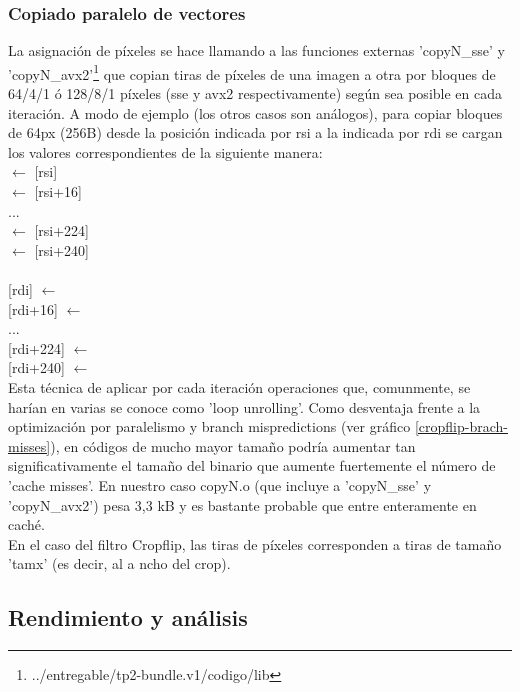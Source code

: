 \subsubsection{Copiado paralelo de vectores}
\label{explicacionCopyN}

La asignación de píxeles se hace llamando a las funciones externas 'copyN_sse' y 'copyN_avx2'\footnote{../entregable/tp2-bundle.v1/codigo/lib} que copian tiras de píxeles de una imagen a otra por bloques de 64/4/1 ó 128/8/1 píxeles (sse y avx2 respectivamente) según sea posible en cada iteración. A modo de ejemplo (los otros casos son análogos), para copiar bloques de 64px (256B) desde la posición indicada por rsi a la indicada por rdi se cargan los valores correspondientes de la siguiente manera:
\newline
\\
 $\leftarrow$ {[rsi]} \\
 $\leftarrow$ {[rsi+16]} \\
... \\
 $\leftarrow$ {[rsi+224]}  \\
 $\leftarrow$ {[rsi+240]} \\
\\
{[rdi]} $\leftarrow$  \\
{[rdi+16]} $\leftarrow$  \\
... \\
{[rdi+224]} $\leftarrow$  \\
{[rdi+240]} $\leftarrow$  \\

Esta técnica de aplicar por cada iteración operaciones que, comunmente, se harían en varias se conoce como 'loop unrolling'. Como desventaja frente a la optimización por paralelismo y branch mispredictions (ver gráfico \ref{cropflip-brach-misses}), en códigos de mucho mayor tamaño podría aumentar tan significativamente el tamaño del binario que aumente fuertemente el número de 'cache misses'. En nuestro caso copyN.o (que incluye a 'copyN_sse' y 'copyN_avx2') pesa 3,3 kB y es bastante probable que entre enteramente en caché.
\\

En el caso del filtro Cropflip, las tiras de píxeles corresponden a tiras de tamaño 'tamx' (es decir, al a	ncho del crop).  


\subsection{Rendimiento y análisis}


